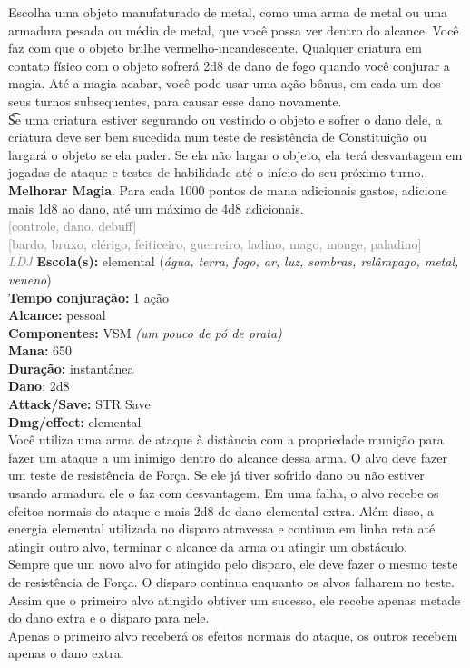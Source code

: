 \documentclass{RPG_Adventure}[2021/10/20]
\begin{document}
{\normalsize Escolha uma objeto manufaturado de metal, como uma arma de metal ou uma armadura pesada ou média de metal, que você possa ver dentro do alcance. Você faz com que o objeto brilhe vermelho-incandescente. Qualquer criatura em contato físico com o objeto sofrerá 2d8 de dano de fogo quando você conjurar a magia. Até a magia acabar, você pode usar uma ação bônus, em cada um dos seus turnos subsequentes, para causar esse dano novamente.\\\t Se uma criatura estiver segurando ou vestindo o objeto e sofrer o dano dele, a criatura deve ser bem sucedida num teste de resistência de Constituição ou largará o objeto se ela puder. Se ela não largar o objeto, ela terá desvantagem em jogadas de ataque e testes de habilidade até o início do seu próximo turno.\\\t \textbf{Melhorar Magia}. Para cada 1000 pontos de mana adicionais gastos, adicione mais 1d8 ao dano, até um máximo de 4d8 adicionais.\\}
{\scriptsize \textcolor{gray}{[controle, dano, debuff]\\}}
{\scriptsize \textcolor{gray}{[bardo, bruxo, clérigo, feiticeiro, guerreiro, ladino, mago, monge, paladino]\\}}
{\tiny \textcolor{gray}{\textit{LDJ}}}\jump{}
{\small \t \textbf{Escola(s):} elemental (\textit{água, terra, fogo, ar, luz, sombras, relâmpago, metal, veneno})\\\t \textbf{Tempo conjuração:} 1 ação\\\t \textbf{Alcance:} pessoal\\\t \textbf{Componentes:} VSM \textit{(um pouco de pó de prata)}\\\t \textbf{Mana:} 650\\\t \textbf{Duração:} instantânea\\\t \textbf{Dano}: 2d8\\\t \textbf{Attack/Save:} STR Save\\\t \textbf{Dmg/effect:} elemental\\}
{\normalsize Você utiliza uma arma de ataque à distância com a propriedade munição para fazer um ataque a um inimigo dentro do alcance dessa arma. O alvo deve fazer um teste de resistência de Força. Se ele já tiver sofrido dano ou não estiver usando armadura ele o faz com desvantagem. Em uma falha, o alvo recebe os efeitos normais do ataque e mais 2d8 de dano elemental extra. Além disso, a energia elemental utilizada no disparo atravessa e continua em linha reta até atingir outro alvo, terminar o alcance da arma ou atingir um obstáculo.\\Sempre que um novo alvo for atingido pelo disparo, ele deve fazer o mesmo teste de resistência de Força. O disparo continua enquanto os alvos falharem no teste. Assim que o primeiro alvo atingido obtiver um sucesso, ele recebe apenas metade do dano extra e o disparo para nele.\\Apenas o primeiro alvo receberá os efeitos normais do ataque, os outros recebem apenas o dano extra.\\}
\end{document}
